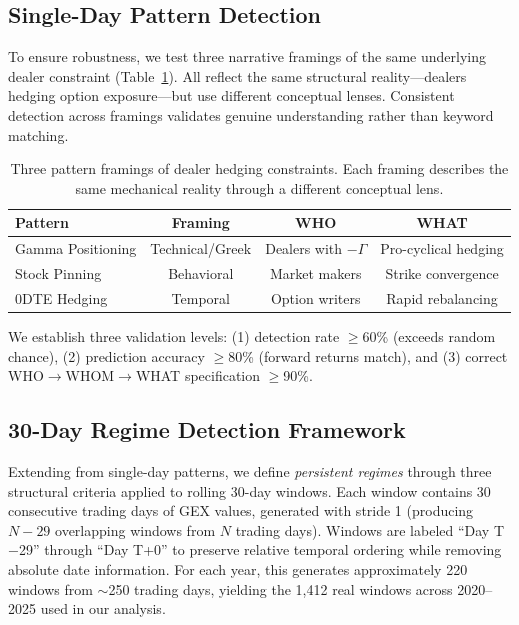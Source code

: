 \subsection{Single-Day Pattern Detection}
\label{subsec:single_day_method}

To ensure robustness, we test three narrative framings of the same underlying dealer constraint (Table~\ref{tab:patterns}). All reflect the same structural reality---dealers hedging option exposure---but use different conceptual lenses. Consistent detection across framings validates genuine understanding rather than keyword matching.

\begin{table}[!htbp]
\centering
\caption{Three pattern framings of dealer hedging constraints. Each framing describes the same mechanical reality through a different conceptual lens.}
\label{tab:patterns}
\small
\begin{tabular}{@{}lccc@{}}
\toprule
\textbf{Pattern} & \textbf{Framing} & \textbf{WHO} & \textbf{WHAT} \\
\midrule
Gamma Positioning & Technical/Greek & Dealers with $-\Gamma$ & Pro-cyclical hedging \\
Stock Pinning & Behavioral & Market makers & Strike convergence \\
0DTE Hedging & Temporal & Option writers & Rapid rebalancing \\
\bottomrule
\end{tabular}
\end{table}

We establish three validation levels: (1) detection rate $\geq$60\% (exceeds random chance), (2) prediction accuracy $\geq$80\% (forward returns match), and (3) correct WHO$\rightarrow$WHOM$\rightarrow$WHAT specification $\geq$90\%.

\subsection{30-Day Regime Detection Framework}
\label{subsec:regime_method}

Extending from single-day patterns, we define \textit{persistent regimes} through three structural criteria applied to rolling 30-day windows. Each window contains 30 consecutive trading days of GEX values, generated with stride 1 (producing $N - 29$ overlapping windows from $N$ trading days). Windows are labeled ``Day T$-$29'' through ``Day T+0'' to preserve relative temporal ordering while removing absolute date information. For each year, this generates approximately 220 windows from $\sim$250 trading days, yielding the 1,412 real windows across 2020--2025 used in our analysis.


